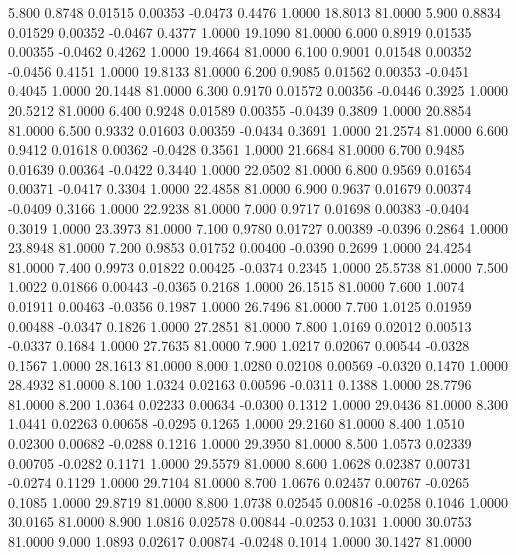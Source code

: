    5.800   0.8748   0.01515   0.00353  -0.0473   0.4476   1.0000  18.8013  81.0000
   5.900   0.8834   0.01529   0.00352  -0.0467   0.4377   1.0000  19.1090  81.0000
   6.000   0.8919   0.01535   0.00355  -0.0462   0.4262   1.0000  19.4664  81.0000
   6.100   0.9001   0.01548   0.00352  -0.0456   0.4151   1.0000  19.8133  81.0000
   6.200   0.9085   0.01562   0.00353  -0.0451   0.4045   1.0000  20.1448  81.0000
   6.300   0.9170   0.01572   0.00356  -0.0446   0.3925   1.0000  20.5212  81.0000
   6.400   0.9248   0.01589   0.00355  -0.0439   0.3809   1.0000  20.8854  81.0000
   6.500   0.9332   0.01603   0.00359  -0.0434   0.3691   1.0000  21.2574  81.0000
   6.600   0.9412   0.01618   0.00362  -0.0428   0.3561   1.0000  21.6684  81.0000
   6.700   0.9485   0.01639   0.00364  -0.0422   0.3440   1.0000  22.0502  81.0000
   6.800   0.9569   0.01654   0.00371  -0.0417   0.3304   1.0000  22.4858  81.0000
   6.900   0.9637   0.01679   0.00374  -0.0409   0.3166   1.0000  22.9238  81.0000
   7.000   0.9717   0.01698   0.00383  -0.0404   0.3019   1.0000  23.3973  81.0000
   7.100   0.9780   0.01727   0.00389  -0.0396   0.2864   1.0000  23.8948  81.0000
   7.200   0.9853   0.01752   0.00400  -0.0390   0.2699   1.0000  24.4254  81.0000
   7.400   0.9973   0.01822   0.00425  -0.0374   0.2345   1.0000  25.5738  81.0000
   7.500   1.0022   0.01866   0.00443  -0.0365   0.2168   1.0000  26.1515  81.0000
   7.600   1.0074   0.01911   0.00463  -0.0356   0.1987   1.0000  26.7496  81.0000
   7.700   1.0125   0.01959   0.00488  -0.0347   0.1826   1.0000  27.2851  81.0000
   7.800   1.0169   0.02012   0.00513  -0.0337   0.1684   1.0000  27.7635  81.0000
   7.900   1.0217   0.02067   0.00544  -0.0328   0.1567   1.0000  28.1613  81.0000
   8.000   1.0280   0.02108   0.00569  -0.0320   0.1470   1.0000  28.4932  81.0000
   8.100   1.0324   0.02163   0.00596  -0.0311   0.1388   1.0000  28.7796  81.0000
   8.200   1.0364   0.02233   0.00634  -0.0300   0.1312   1.0000  29.0436  81.0000
   8.300   1.0441   0.02263   0.00658  -0.0295   0.1265   1.0000  29.2160  81.0000
   8.400   1.0510   0.02300   0.00682  -0.0288   0.1216   1.0000  29.3950  81.0000
   8.500   1.0573   0.02339   0.00705  -0.0282   0.1171   1.0000  29.5579  81.0000
   8.600   1.0628   0.02387   0.00731  -0.0274   0.1129   1.0000  29.7104  81.0000
   8.700   1.0676   0.02457   0.00767  -0.0265   0.1085   1.0000  29.8719  81.0000
   8.800   1.0738   0.02545   0.00816  -0.0258   0.1046   1.0000  30.0165  81.0000
   8.900   1.0816   0.02578   0.00844  -0.0253   0.1031   1.0000  30.0753  81.0000
   9.000   1.0893   0.02617   0.00874  -0.0248   0.1014   1.0000  30.1427  81.0000
